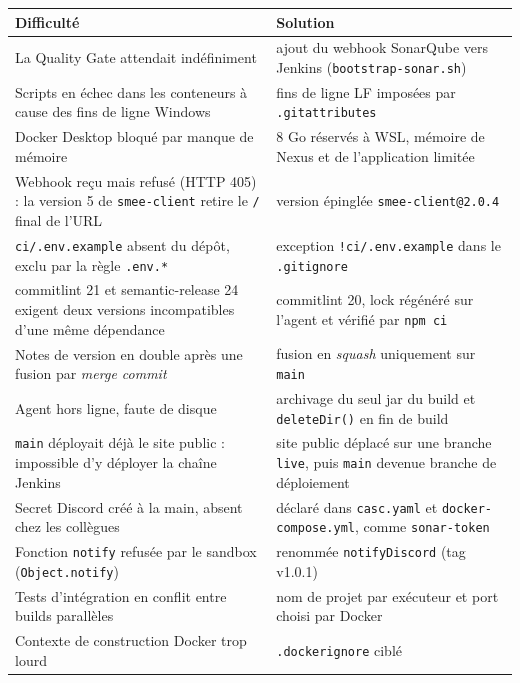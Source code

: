 \documentclass[11pt,a4paper]{report}
\begin{document}
\begin{table}[H]
  \centering
  \small
  \begin{tabularx}{\textwidth}{@{}YY@{}}
    \toprule
    \textbf{Difficulté} & \textbf{Solution} \\
    \midrule
    La Quality Gate attendait indéfiniment & ajout du webhook SonarQube vers Jenkins (\texttt{bootstrap-sonar.sh}) \\
    Scripts en échec dans les conteneurs à cause des fins de ligne Windows & fins de ligne LF imposées par \texttt{.gitattributes} \\
    Docker Desktop bloqué par manque de mémoire & 8 Go réservés à WSL, mémoire de Nexus et de l'application limitée \\
    \addlinespace
    Webhook reçu mais refusé (HTTP 405) : la version 5 de \texttt{smee-client} retire le \texttt{/} final de l'URL & version épinglée \texttt{smee-client@2.0.4} \\
    \addlinespace
    \texttt{ci/.env.example} absent du dépôt, exclu par la règle \texttt{.env.*} & exception \texttt{!ci/.env.example} dans le \texttt{.gitignore} \\
    \addlinespace
    commitlint 21 et semantic-release 24 exigent deux versions incompatibles d'une même dépendance & commitlint 20, lock régénéré sur l'agent et vérifié par \texttt{npm ci} \\
    \addlinespace
    Notes de version en double après une fusion par \emph{merge commit} & fusion en \emph{squash} uniquement sur \texttt{main} \\
    \addlinespace
    Agent hors ligne, faute de disque & archivage du seul jar du build et \texttt{deleteDir()} en fin de build \\
    \addlinespace
    \texttt{main} déployait déjà le site public : impossible d'y déployer la chaîne Jenkins & site public déplacé sur une branche \texttt{live}, puis \texttt{main} devenue branche de déploiement \\
    \addlinespace
    Secret Discord créé à la main, absent chez les collègues & déclaré dans \texttt{casc.yaml} et \texttt{docker-compose.yml}, comme \texttt{sonar-token} \\
    Fonction \texttt{notify} refusée par le sandbox (\texttt{Object.notify}) & renommée \texttt{notifyDiscord} (tag v1.0.1) \\
    Tests d'intégration en conflit entre builds parallèles & nom de projet par exécuteur et port choisi par Docker \\
    Contexte de construction Docker trop lourd & \texttt{.dockerignore} ciblé \\

\end{tabularx}
\end{table}
\end{document}
